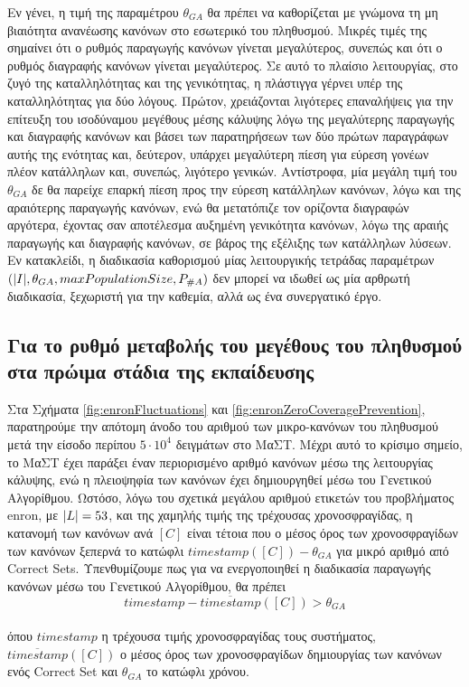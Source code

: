 Εν γένει, η τιμή της παραμέτρου $\theta_{GA}$ θα πρέπει να καθορίζεται με γνώμονα τη μη βιαιότητα ανανέωσης κανόνων στο εσωτερικό του πληθυσμού. Μικρές τιμές της σημαίνει ότι ο ρυθμός παραγωγής κανόνων γίνεται μεγαλύτερος, συνεπώς και ότι ο ρυθμός διαγραφής κανόνων γίνεται μεγαλύτερος. Σε αυτό το πλαίσιο λειτουργίας, στο ζυγό της καταλληλότητας και της γενικότητας, η πλάστιγγα γέρνει υπέρ της καταλληλότητας για δύο λόγους. Πρώτον, χρειάζονται λιγότερες επαναλήψεις για την επίτευξη του ισοδύναμου μεγέθους μέσης κάλυψης λόγω της μεγαλύτερης παραγωγής και διαγραφής κανόνων και βάσει των παρατηρήσεων των δύο πρώτων παραγράφων αυτής της ενότητας και, δεύτερον, υπάρχει μεγαλύτερη πίεση για εύρεση γονέων πλέον κατάλληλων και, συνεπώς, λιγότερο γενικών. Αντίστροφα, μία μεγάλη τιμή του $\theta_{GA}$ δε θα παρείχε επαρκή πίεση προς την εύρεση κατάλληλων κανόνων, λόγω και της αραιότερης παραγωγής κανόνων, ενώ θα μετατόπιζε τον ορίζοντα διαγραφών αργότερα, έχοντας σαν αποτέλεσμα αυξημένη γενικότητα κανόνων, λόγω της αραιής παραγωγής και διαγραφής κανόνων, σε βάρος της εξέλιξης των κατάλληλων λύσεων. Εν κατακλείδι, η διαδικασία καθορισμού μίας λειτουργικής τετράδας παραμέτρων $(\lvert I\rvert, \theta_{GA}, maxPopulationSize, P_{\#A})$ δεν μπορεί να ιδωθεί ως μία αρθρωτή διαδικασία, ξεχωριστή για την καθεμία, αλλά ως ένα συνεργατικό έργο.


\subsection{Για το ρυθμό μεταβολής του μεγέθους του πληθυσμού στα πρώιμα στάδια της εκπαίδευσης}
Στα Σχήματα \ref{fig:enronFluctuations} και \ref{fig:enronZeroCoveragePrevention}, παρατηρούμε την απότομη άνοδο του αριθμού των μικρο-κανόνων του πληθυσμού μετά την είσοδο περίπου $5 \cdot 10^{4}$ δειγμάτων στο ΜαΣΤ. Μέχρι αυτό το κρίσιμο σημείο, το ΜαΣΤ έχει παράξει έναν περιορισμένο αριθμό κανόνων μέσω της λειτουργίας κάλυψης, ενώ η πλειοψηφία των κανόνων έχει δημιουργηθεί μέσω του Γενετικού Αλγορίθμου. Ωστόσο, λόγω του σχετικά μεγάλου αριθμού ετικετών του προβλήματος enron, με $\lvert L\rvert=53$, και της χαμηλής τιμής της τρέχουσας χρονοσφραγίδας, η κατανομή των κανόνων ανά $[C]$ είναι τέτοια που ο μέσος όρος των χρονοσφραγίδων των κανόνων ξεπερνά το κατώφλι $timestamp([C]) - \theta_{GA}$ για μικρό αριθμό από Correct Sets. Υπενθυμίζουμε πως για να ενεργοποιηθεί η διαδικασία παραγωγής κανόνων μέσω του Γενετικού Αλγορίθμου, θα πρέπει
\begin{equation}
timestamp - \overline{timestamp}([C]) > \theta_{GA}
\end{equation}
\\
όπου $timestamp$ η τρέχουσα τιμής χρονοσφραγίδας τους συστήματος, 
\\
$\overline{timestamp}([C])$ ο μέσος όρος των χρονοσφραγίδων δημιουργίας των κανόνων ενός Correct Set και $\theta_{GA}$ το κατώφλι χρόνου. 

